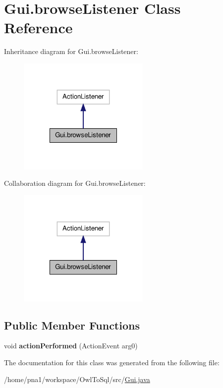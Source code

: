 \hypertarget{class_gui_1_1browse_listener}{
\section{Gui.browseListener Class Reference}
\label{class_gui_1_1browse_listener}
}


Inheritance diagram for Gui.browseListener:\nopagebreak
\begin{figure}[H]
\begin{center}
\leavevmode
\includegraphics[width=180pt]{class_gui_1_1browse_listener__inherit__graph}
\end{center}
\end{figure}


Collaboration diagram for Gui.browseListener:\nopagebreak
\begin{figure}[H]
\begin{center}
\leavevmode
\includegraphics[width=180pt]{class_gui_1_1browse_listener__coll__graph}
\end{center}
\end{figure}
\subsection*{Public Member Functions}
\begin{DoxyCompactItemize}
\item 
\hypertarget{class_gui_1_1browse_listener_ab01bfe752fe29efd0a65b9a13fd0382b}{
void {\bfseries actionPerformed} (ActionEvent arg0)}
\label{class_gui_1_1browse_listener_ab01bfe752fe29efd0a65b9a13fd0382b}

\end{DoxyCompactItemize}


The documentation for this class was generated from the following file:\begin{DoxyCompactItemize}
\item 
/home/pna1/workspace/OwlToSql/src/\hyperlink{_gui_8java}{Gui.java}\end{DoxyCompactItemize}
